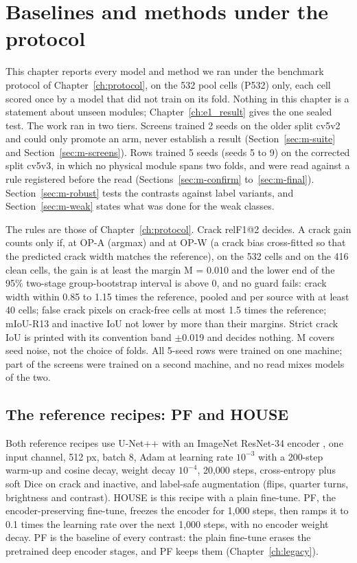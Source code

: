 \chapter{Baselines and methods under the protocol}\label{ch:methods}

This chapter reports every model and method we ran under the benchmark protocol of Chapter~\ref{ch:protocol}, on the 532 pool
cells (P532) only, each cell scored once by a model that did not train on its fold. Nothing in this chapter is a statement about
unseen modules; Chapter~\ref{ch:e1_result} gives the one sealed test. The work ran in two tiers. Screens trained 2 seeds on
the older split cv5v2 and could only promote an arm, never establish a result (Section~\ref{sec:m-suite} and
Section~\ref{sec:m-screens}). Rows trained 5 seeds (seeds 5 to 9) on the corrected split cv5v3, in which no physical module
spans two folds, and were read against a rule registered before the read (Sections~\ref{sec:m-confirm} to~\ref{sec:m-final}).
Section~\ref{sec:m-robust} tests the contrasts against label variants, and Section~\ref{sec:m-weak} states what was done for the
weak classes.

The rules are those of Chapter~\ref{ch:protocol}. Crack relF1@2 decides. A crack gain counts only if, at OP-A (argmax) and at
OP-W (a crack bias cross-fitted so that the predicted crack width matches the reference), on the 532 cells and on the 416 clean
cells, the gain is at least the margin M = 0.010 and the lower end of the 95\% two-stage group-bootstrap interval is above 0,
and no guard fails: crack width within 0.85 to 1.15 times the reference, pooled and per source with at least 40 cells; false
crack pixels on crack-free cells at most 1.5 times the reference; mIoU-R13 and inactive IoU not lower by more than their margins.
Strict crack IoU is printed with its convention band $\pm$0.019 and decides nothing. M covers seed noise, not the choice of
folds. All 5-seed rows were trained on one machine; part of the screens were trained on a second machine, and no read mixes
models of the two.

\section{The reference recipes: PF and HOUSE}\label{sec:m-ref}

Both reference recipes use U-Net++ \citep{zhou2018unetpp} with an ImageNet ResNet-34 encoder \citep{he2015resnet}, one input
channel, 512 px, batch 8, Adam at learning rate $10^{-3}$ with a 200-step warm-up and cosine decay, weight decay $10^{-4}$,
20,000 steps, cross-entropy plus soft Dice on crack and inactive, and label-safe augmentation (flips, quarter turns, brightness
and contrast). HOUSE is this recipe with a plain fine-tune. PF, the encoder-preserving fine-tune, freezes the encoder for
1,000 steps, then ramps it to 0.1 times the learning rate over the next 1,000 steps, with no encoder weight decay. PF is the baseline of every contrast:
the plain fine-tune erases the pretrained deep encoder stages, and PF keeps them (Chapter~\ref{ch:legacy}).

